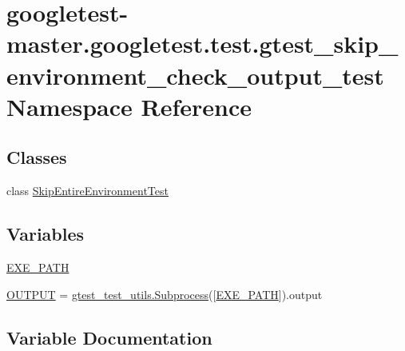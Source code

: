 \hypertarget{namespacegoogletest-master_1_1googletest_1_1test_1_1gtest__skip__environment__check__output__test}{}\section{googletest-\/master.googletest.\+test.\+gtest\+\_\+skip\+\_\+environment\+\_\+check\+\_\+output\+\_\+test Namespace Reference}
\label{namespacegoogletest-master_1_1googletest_1_1test_1_1gtest__skip__environment__check__output__test}
\subsection*{Classes}
\begin{DoxyCompactItemize}
\item 
class \mbox{\hyperlink{classgoogletest-master_1_1googletest_1_1test_1_1gtest__skip__environment__check__output__test_1_1_skip_entire_environment_test}{Skip\+Entire\+Environment\+Test}}
\end{DoxyCompactItemize}
\subsection*{Variables}
\begin{DoxyCompactItemize}
\item 
\mbox{\hyperlink{namespacegoogletest-master_1_1googletest_1_1test_1_1gtest__skip__environment__check__output__test_a24d2267b249d3f26eaafb4224a29ac12}{E\+X\+E\+\_\+\+P\+A\+TH}}
\item 
\mbox{\hyperlink{namespacegoogletest-master_1_1googletest_1_1test_1_1gtest__skip__environment__check__output__test_a4762ff7226dd1a2284e5f52de80a648a}{O\+U\+T\+P\+UT}} = \mbox{\hyperlink{classgoogletest-master_1_1googletest_1_1test_1_1gtest__test__utils_1_1_subprocess}{gtest\+\_\+test\+\_\+utils.\+Subprocess}}(\mbox{[}\mbox{\hyperlink{namespacegoogletest-master_1_1googletest_1_1test_1_1gtest__skip__environment__check__output__test_a24d2267b249d3f26eaafb4224a29ac12}{E\+X\+E\+\_\+\+P\+A\+TH}}\mbox{]}).output
\end{DoxyCompactItemize}


\subsection{Variable Documentation}
\mbox{\label{namespacegoogletest-master_1_1googletest_1_1test_1_1gtest__skip__environment__check__output__test_a24d2267b249d3f26eaafb4224a29ac12}} 
